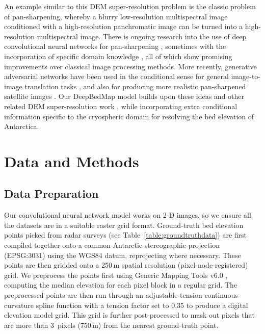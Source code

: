 An example similar to this DEM super-resolution problem is the classic problem of pan-sharpening, whereby a blurry low-resolution multispectral image conditioned with a high-resolution panchromatic image can be turned into a high-resolution multispectral image.
There is ongoing research into the use of deep convolutional neural networks for pan-sharpening \citep{MasiPansharpeningConvolutionalNeural2016,ScarpaTargetAdaptiveCNNBasedPansharpening2018}, sometimes with the incorporation of specific domain knowledge \citep{YangPanNetDeepNetwork2017}, all of which show promising improvements over classical image processing methods.
More recently, generative adversarial networks \citep{GoodfellowGenerativeAdversarialNetworks2014} have been used in the conditional sense for general image-to-image translation tasks \citep[e.g.][]{IsolaImagetoImageTranslationConditional2016,ParkSemanticImageSynthesis2019}, and also for producing more realistic pan-sharpened satellite images \citep{LiuPSGANGenerativeAdversarial2018}.
Our DeepBedMap model builds upon these ideas and other related DEM super-resolution work \citep{XuNonlocalsimilaritybased2015,ChenConvolutionalNeuralNetwork2016}, while incorporating extra conditional information specific to the cryospheric domain for resolving the bed elevation of Antarctica.


\section{Data and Methods}

\subsection{Data Preparation} \label{section:datapreparation}

Our convolutional neural network model works on 2-D images, so we ensure all the datasets are in a suitable raster grid format.
Ground-truth bed elevation points picked from radar surveys (see Table~\ref{table:groundtruthdata}) are first compiled together onto a common Antarctic stereographic projection (EPSG:3031) using the WGS84 datum, reprojecting where necessary.
These points are then gridded onto a 250\,\unit{m} spatial resolution (pixel-node-registered) grid.
We preprocess the points first using Generic Mapping Tools v6.0 \citep[GMT6;][]{WesselGenericMappingTools2019}, computing the median elevation for each pixel block in a regular grid.
The preprocessed points are then run through an adjustable-tension continuous-curvature spline function with a tension factor set to 0.35 to produce a digital elevation model grid.
This grid is further post-processed to mask out pixels that are more than 3~\unit{pixels} (750\,\unit{m}) from the nearest ground-truth point.

